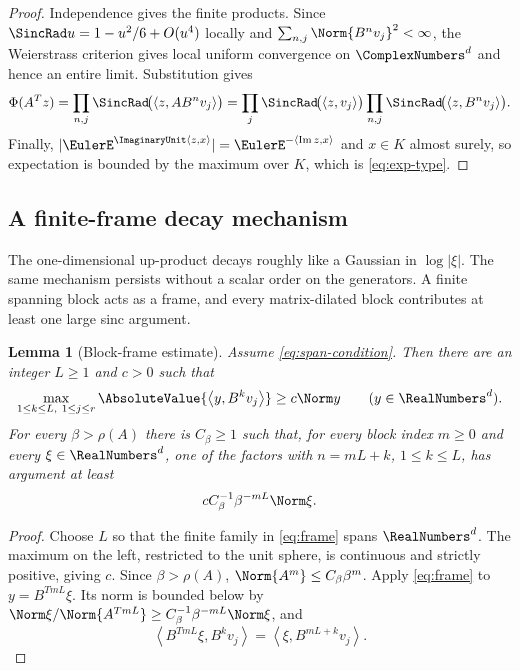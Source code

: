 \documentclass[11pt,oneside]{article}
\newtheorem{lemma}[theorem]{Lemma}
\theoremstyle{definition}
\theoremstyle{remark}
\newcommand{\ip}[2]{\left\langle #1,#2\right\rangle}
\begin{document}
\begin{proof}
Independence gives the finite products.  Since
$\SincRad u=1-u^2/6+O(u^4)$ locally and
$\sum_{n,j}\Norm{B^nv_j}^2<\infty$, the Weierstrass criterion gives local
uniform convergence on $\ComplexNumbers^d$ and hence an entire limit.  Substitution gives
\[
 \Phi(A^Tz)
 =\prod_{n,j}\SincRad\!\bigl(\ip{z}{AB^nv_j}\bigr)
 =\prod_j\SincRad\!\bigl(\ip{z}{v_j}\bigr)
  \prod_{n,j}\SincRad\!\bigl(\ip{z}{B^nv_j}\bigr).
\]
Finally, $|\EulerE^{\ImaginaryUnit\ip{z}{x}}|=\EulerE^{-\ip{\operatorname{Im}z}{x}}$ and
$x\in K$ almost surely, so expectation is bounded by the maximum over $K$,
which is \eqref{eq:exp-type}.
\end{proof}

\subsection{A finite-frame decay mechanism}

The one-dimensional up-product decays roughly like a Gaussian in $\log|\xi|$.
The same mechanism persists without a scalar order on the generators.  A finite
spanning block acts as a frame, and every matrix-dilated block contributes at
least one large sinc argument.

\begin{lemma}[Block-frame estimate]
\label{lem:block-frame}
Assume \eqref{eq:span-condition}.  Then there are an integer $L\ge1$ and $c>0$
such that
\begin{equation}
 \max_{1\le k\le L,\ 1\le j\le r}
 \AbsoluteValue{\ip{y}{B^kv_j}}\ge c\Norm y
 \qquad(y\in\RealNumbers^d).
 \label{eq:frame}
\end{equation}
For every $\beta>\rho(A)$ there is $C_\beta\ge1$ such that, for every block
index $m\ge0$ and every $\xi\in\RealNumbers^d$, one of the factors with
$n=mL+k$, $1\le k\le L$, has argument at least
\begin{equation}
 cC_\beta^{-1}\beta^{-mL}\Norm\xi.
 \label{eq:block-large}
\end{equation}
\end{lemma}

\begin{proof}
Choose $L$ so that the finite family in \eqref{eq:frame} spans $\RealNumbers^d$.
The maximum on the left, restricted to the unit sphere, is continuous and
strictly positive, giving $c$.  Since $\beta>\rho(A)$,
$\Norm{A^m}\le C_\beta\beta^m$.  Apply \eqref{eq:frame} to
$y=B^{TmL}\xi$.  Its norm is bounded below by
$\Norm\xi/\Norm{A^{TmL}}\ge C_\beta^{-1}\beta^{-mL}\Norm\xi$, and
\[
 \ip{B^{TmL}\xi}{B^kv_j}=\ip{\xi}{B^{mL+k}v_j}.
\]
\end{proof}
\end{document}
